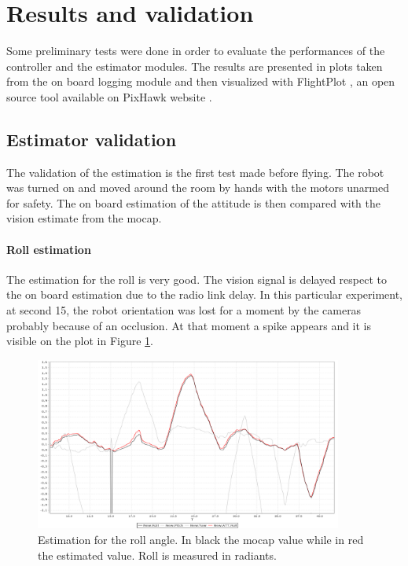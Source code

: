 \section{Results and validation}

Some preliminary tests were done in order to evaluate the performances of the controller and the estimator modules. The results are presented in plots taken from the on board logging module and then visualized with FlightPlot , an open source tool available on PixHawk website \cite{FPlot}.   

\subsection{Estimator validation}

The validation of the estimation is the first test made before flying. The robot was turned on and moved around the room by hands with the motors unarmed for safety. The on board estimation of the attitude is then compared with the vision estimate from the mocap. \\

\noindent
\paragraph{Roll estimation} 
The estimation for the roll is very good. The vision signal is delayed respect to the on board estimation due to the radio link delay. In this particular experiment, at second 15, the robot orientation was lost for a moment by the cameras probably because of an occlusion. At that moment a spike appears and it is visible on the plot in Figure \ref{figure:rollesti}.
\begin{figure}[h]
	\centering
	\noindent
	\includegraphics[width=0.9\textwidth]{roll_esti.png}
	\caption[Roll estimation]{Estimation for the roll angle. In black the mocap value while in red the estimated value. Roll is measured in radiants.}
	\label{figure:rollesti}
\end{figure}

